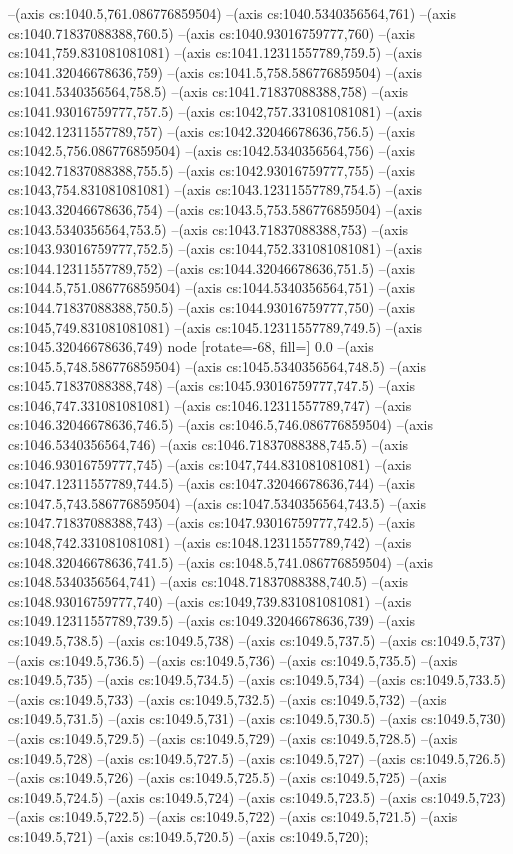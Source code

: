 --(axis cs:1040.5,761.086776859504)
--(axis cs:1040.5340356564,761)
--(axis cs:1040.71837088388,760.5)
--(axis cs:1040.93016759777,760)
--(axis cs:1041,759.831081081081)
--(axis cs:1041.12311557789,759.5)
--(axis cs:1041.32046678636,759)
--(axis cs:1041.5,758.586776859504)
--(axis cs:1041.5340356564,758.5)
--(axis cs:1041.71837088388,758)
--(axis cs:1041.93016759777,757.5)
--(axis cs:1042,757.331081081081)
--(axis cs:1042.12311557789,757)
--(axis cs:1042.32046678636,756.5)
--(axis cs:1042.5,756.086776859504)
--(axis cs:1042.5340356564,756)
--(axis cs:1042.71837088388,755.5)
--(axis cs:1042.93016759777,755)
--(axis cs:1043,754.831081081081)
--(axis cs:1043.12311557789,754.5)
--(axis cs:1043.32046678636,754)
--(axis cs:1043.5,753.586776859504)
--(axis cs:1043.5340356564,753.5)
--(axis cs:1043.71837088388,753)
--(axis cs:1043.93016759777,752.5)
--(axis cs:1044,752.331081081081)
--(axis cs:1044.12311557789,752)
--(axis cs:1044.32046678636,751.5)
--(axis cs:1044.5,751.086776859504)
--(axis cs:1044.5340356564,751)
--(axis cs:1044.71837088388,750.5)
--(axis cs:1044.93016759777,750)
--(axis cs:1045,749.831081081081)
--(axis cs:1045.12311557789,749.5)
--(axis cs:1045.32046678636,749) node [rotate=-68, fill=\bgcol] {0.0}
--(axis cs:1045.5,748.586776859504)
--(axis cs:1045.5340356564,748.5)
--(axis cs:1045.71837088388,748)
--(axis cs:1045.93016759777,747.5)
--(axis cs:1046,747.331081081081)
--(axis cs:1046.12311557789,747)
--(axis cs:1046.32046678636,746.5)
--(axis cs:1046.5,746.086776859504)
--(axis cs:1046.5340356564,746)
--(axis cs:1046.71837088388,745.5)
--(axis cs:1046.93016759777,745)
--(axis cs:1047,744.831081081081)
--(axis cs:1047.12311557789,744.5)
--(axis cs:1047.32046678636,744)
--(axis cs:1047.5,743.586776859504)
--(axis cs:1047.5340356564,743.5)
--(axis cs:1047.71837088388,743)
--(axis cs:1047.93016759777,742.5)
--(axis cs:1048,742.331081081081)
--(axis cs:1048.12311557789,742)
--(axis cs:1048.32046678636,741.5)
--(axis cs:1048.5,741.086776859504)
--(axis cs:1048.5340356564,741)
--(axis cs:1048.71837088388,740.5)
--(axis cs:1048.93016759777,740)
--(axis cs:1049,739.831081081081)
--(axis cs:1049.12311557789,739.5)
--(axis cs:1049.32046678636,739)
--(axis cs:1049.5,738.5)
--(axis cs:1049.5,738)
--(axis cs:1049.5,737.5)
--(axis cs:1049.5,737)
--(axis cs:1049.5,736.5)
--(axis cs:1049.5,736)
--(axis cs:1049.5,735.5)
--(axis cs:1049.5,735)
--(axis cs:1049.5,734.5)
--(axis cs:1049.5,734)
--(axis cs:1049.5,733.5)
--(axis cs:1049.5,733)
--(axis cs:1049.5,732.5)
--(axis cs:1049.5,732)
--(axis cs:1049.5,731.5)
--(axis cs:1049.5,731)
--(axis cs:1049.5,730.5)
--(axis cs:1049.5,730)
--(axis cs:1049.5,729.5)
--(axis cs:1049.5,729)
--(axis cs:1049.5,728.5)
--(axis cs:1049.5,728)
--(axis cs:1049.5,727.5)
--(axis cs:1049.5,727)
--(axis cs:1049.5,726.5)
--(axis cs:1049.5,726)
--(axis cs:1049.5,725.5)
--(axis cs:1049.5,725)
--(axis cs:1049.5,724.5)
--(axis cs:1049.5,724)
--(axis cs:1049.5,723.5)
--(axis cs:1049.5,723)
--(axis cs:1049.5,722.5)
--(axis cs:1049.5,722)
--(axis cs:1049.5,721.5)
--(axis cs:1049.5,721)
--(axis cs:1049.5,720.5)
--(axis cs:1049.5,720);


